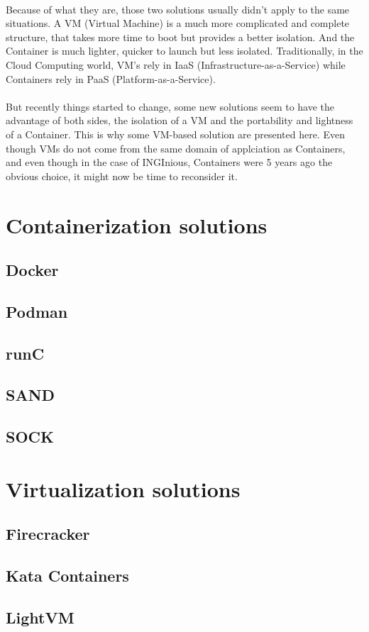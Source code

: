 \paragraph{}Because of what they are, those two solutions usually didn't apply to the same situations.  A VM (Virtual Machine) is a much more complicated and complete structure, that takes more time to boot but provides a better isolation.  And the Container is much lighter, quicker to launch but less isolated.  Traditionally, in the Cloud Computing world, VM's rely in IaaS (Infrastructure-as-a-Service) while Containers rely in PaaS (Platform-as-a-Service).

\paragraph{}But recently things started to change, some new solutions seem to have the advantage of both sides, the isolation of a VM and the portability and lightness of a Container.  This is why some VM-based solution are presented here.  Even though VMs do not come from the same domain of applciation as Containers, and even though in the case of INGInious, Containers were 5 years ago the obvious choice, it might now be time to reconsider it.

\section{Containerization solutions}
\subsection{Docker}
\subsection{Podman}
\subsection{runC}
\subsection{SAND}
\subsection{SOCK} \cite{oakes2018sock}

\section{Virtualization solutions}
\subsection{Firecracker}
\subsection{Kata Containers}
\subsection{LightVM} \cite{manco2017my}
